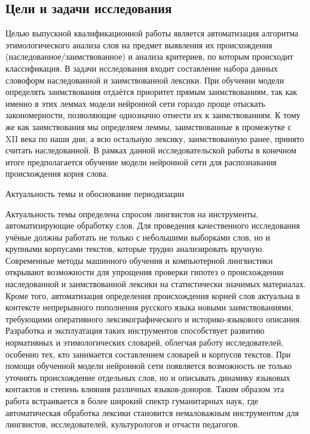 \subsection{Цели и задачи исследования}\label{ux446ux435ux43bux438-ux438-ux437ux430ux434ux430ux447ux438-ux438ux441ux441ux43bux435ux434ux43eux432ux430ux43dux438ux44f}

Целью выпускной квалификационной работы является автоматизация алгоритма этимологического анализа слов на предмет выявления их происхождения (наследованное/заимствованное) и анализа критериев, по которым происходит классификация. В задачи исследования входит составление набора данных словоформ наследованной и заимствованной лексики. При обучении модели определять заимствования отдаётся приоритет прямым заимствованиям, так как именно в этих леммах модели нейронной сети гораздо проще отыскать закономерности, позволяющие однозначно отнести их к заимствованиям. К тому же как заимствования мы определяем леммы, заимствованные в промежутке с XII века по наши дни, а всю остальную лексику, заимствованную ранее, принято считать наследованной. В рамках данной исследовательской работы в конечном итоге предполагается обучение модели нейронной сети для распознавания происхождения корня слова.

Актуальность темы и обоснование периодизации

Актуальность темы определена спросом лингвистов на инструменты, автоматизирующие обработку слов. Для проведения качественного исследования учёные должны работать не только с небольшими выборками слов, но и крупными корпусами текстов, которые трудно анализировать вручную. Современные методы машинного обучения и компьютерной лингвистики открывают возможности для упрощения проверки гипотез о происхождении наследованной и заимствованной лексики на статистически значимых материалах. Кроме того, автоматизация определения происхождения корней слов актуальна в контексте непрерывного пополнения русского языка новыми заимствованиями, требующими оперативного лексикографического и историко-языкового описания. Разработка и эксплуатация таких инструментов способствует развитию нормативных и этимологических словарей, облегчая работу исследователей, особенно тех, кто занимается составлением словарей и корпусов текстов. При помощи обученной модели нейронной сети появляется возможность не только уточнять происхождение отдельных слов, но и описывать динамику языковых контактов и степень влияния различных языков-доноров. Таким образом эта работа встраивается в более широкий спектр гуманитарных наук, где автоматическая обработка лексики становится немаловажным инструментом для лингвистов, исследователей, культурологов и отчасти педагогов.

